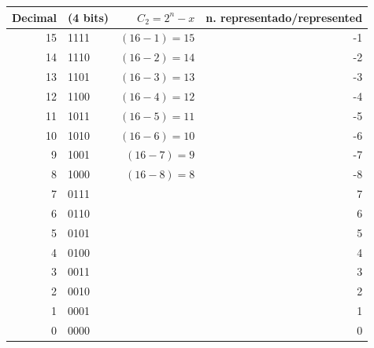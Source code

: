 \begin{table}
\centering
\begin{tabular}{r  l  r  r}
Decimal&  (4 bits) &\ $C_2=2^n-x$ & n. representado/represented\\
\hline
15& 1111&$(16-1)=15$&-1\\
14& 1110&$(16-2)=14$&-2\\
13& 1101&$(16-3)=13$&-3\\
12& 1100&$(16-4)=12$&-4\\
11& 1011&$(16-5)=11$&-5\\
10& 1010&$(16-6)=10$&-6\\
9& 1001& $(16- 7)=9$&-7\\
8& 1000& $(16-8)=8$&-8\\
\hline
\hline
7& 0111& & 7\\
6& 0110& & 6\\
5& 0101& & 5\\
4& 0100& & 4\\
3& 0011& & 3\\
2& 0010& & 2\\
1& 0001& & 1\\
0& 0000& & 0\\
\hline
\end{tabular}
\label{tabla:c2}
\end{table}

